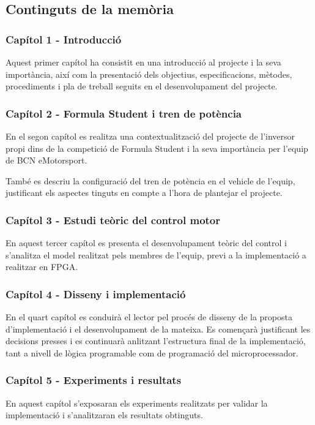\subsection { Continguts de la memòria }
{
    \subsubsection*{ Capítol 1 - Introducció }
    {
        Aquest primer capítol ha consistit en una introducció al projecte i la
        seva importància, així com la presentació dels objectius,
        especificacions, mètodes, procediments i pla de treball seguits en el
        desenvolupament del projecte.
    }

    \subsubsection*{ Capítol 2 - Formula Student i tren de potència }
    {
        En el segon capítol es realitza una contextualització del projecte de
        l'inversor propi dins de la competició de Formula Student i la seva
        importància per l'equip de BCN eMotorsport. 
        
        També es descriu la configuració del tren de potència en el vehicle de
        l'equip, justificant els aspectes tinguts en compte a l'hora de
        plantejar el projecte.
    }

    \subsubsection*{ Capítol 3 - Estudi teòric del control motor }
    {
        En aquest tercer capítol es presenta el desenvolupament teòric del
        control i s'analitza el model realitzat pels membres de l'equip, previ
        a la implementació a realitzar en \ac{FPGA}.
    }

    \subsubsection*{ Capítol 4 - Disseny i implementació }
    {
        En el quart capítol es conduirà el lector pel procés de disseny de la
        proposta d'implementació i el desenvolupament de la mateixa. Es
        començarà justificant les decisions presses i es continuarà anlitzant
        l'estructura final de la implementació, tant a nivell de lògica
        programable com de programació del microprocessador.
    }
    
    \subsubsection*{ Capítol 5 - Experiments i resultats }
    {
        En aquest capítol s'exposaran els experiments realitzats per validar la
        implementació i s'analitzaran els resultats obtinguts.
    }
    
}
